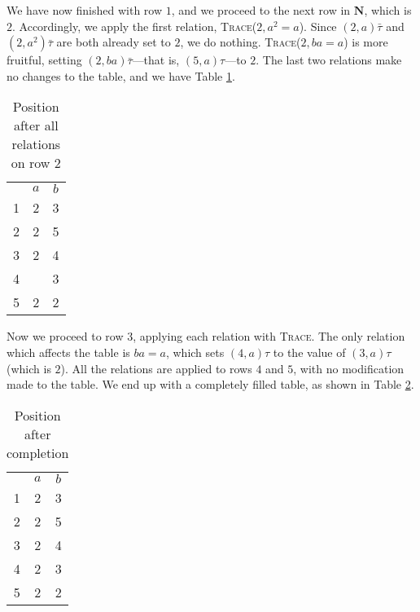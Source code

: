 We have now finished with row $1$, and we proceed to the next row in
$\mathbf{N}$, which is $2$.  Accordingly, we apply the first relation,
\textsc{Trace}($2, a^2=a$).  Since $(2, a)\bar\tau$ and $(2, a^2)\bar\tau$ are
both already set to $2$, we do nothing.  \textsc{Trace}($2, ba=a$) is more
fruitful, setting $(2, ba)\bar\tau$---that is, $(5, a)\tau$---to $2$.  The last
two relations make no changes to the table, and we have Table \ref{tab:tc6}.
\begin{table}[H]
  \centering
  \begin{tabular}{c | c | c |}
    \multicolumn{1}{c}{} &
    \multicolumn{1}{c}{$a$} &
    \multicolumn{1}{c}{$b$} \\
    \cline{2-3}
    1 & 2 & 3 \\
    \cline{2-3}
    2 & 2 & 5 \\
    \cline{2-3}
    3 & 2 & 4 \\
    \cline{2-3}
    4 &  & 3 \\
    \cline{2-3}
    5 & 2 & 2 \\
    \cline{2-3}
  \end{tabular}
  \caption{Position after all relations on row $2$}
  \label{tab:tc6}
\end{table}

Now we proceed to row $3$, applying each relation with \textsc{Trace}.  The only
relation which affects the table is $ba=a$,
which sets $(4, a)\tau$ to the value of $(3, a)\tau$ (which is $2$).
All the relations are applied to rows $4$ and $5$, with no modification made to
the table.  We end up with a completely filled table, as shown in Table
\ref{tab:tc7}.
\begin{table}[H]
  \centering
  \begin{tabular}{c | c | c |}
    \multicolumn{1}{c}{} &
    \multicolumn{1}{c}{$a$} &
    \multicolumn{1}{c}{$b$} \\
    \cline{2-3}
    1 & 2 & 3 \\
    \cline{2-3}
    2 & 2 & 5 \\
    \cline{2-3}
    3 & 2 & 4 \\
    \cline{2-3}
    4 & 2 & 3 \\
    \cline{2-3}
    5 & 2 & 2 \\
    \cline{2-3}
  \end{tabular}
  \caption{Position after completion}
  \label{tab:tc7}
\end{table}


